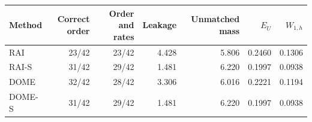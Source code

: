 \begin{tabular}{lrrrrrr}\toprule
Method & Correct order & Order and rates & Leakage & Unmatched mass & $E_U$ & $W_{1,h}$\\\midrule
RAI & 23/42 & 23/42 & 4.428 & 5.806 & 0.2460 & 0.1306 \\
RAI-S & 31/42 & 29/42 & 1.481 & 6.220 & 0.1997 & 0.0938 \\
DOME & 32/42 & 28/42 & 3.306 & 6.016 & 0.2221 & 0.1194 \\
DOME-S & 31/42 & 29/42 & 1.481 & 6.220 & 0.1997 & 0.0938 \\
\bottomrule\end{tabular}
